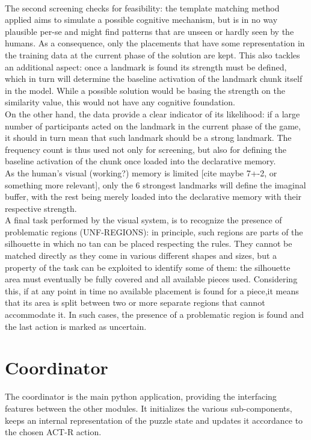 \documentclass[a4paper,singleside,12pt]{report} %
\begin{document}
    \\The second screening checks for feasibility: the template matching method applied aims to
    simulate a possible cognitive mechanism, but is in no way plausible per-se and might find
    patterns that are unseen or hardly seen by the humans. As a consequence, only the placements
    that have some representation in the training data at the current phase of the solution are
    kept. This also tackles an additional aspect: once a landmark is found its strength must be
    defined, which in turn will determine the baseline activation of the landmark chunk itself in
    the model. While a possible solution would be basing the strength on the similarity value, this
    would not have any cognitive foundation. \\On the other hand, the data provide a clear indicator
    of its likelihood: if a large number of participants acted on the landmark in the current phase
    of the game, it should in turn mean that such landmark should be a strong landmark. The
    frequency count is thus used not only for screening, but also for defining the baseline
    activation of the chunk once loaded into the declarative memory.\\
    As the human's visual (working?) memory is limited [cite maybe 7+-2, or something more
    relevant], only the 6 strongest landmarks will define the imaginal buffer, with the rest being
    merely loaded into the declarative memory with their respective strength.\\
    A final task performed by the visual system, is to recognize the presence of problematic regions
    (UNF-REGIONS): in principle, such regions are parts of the silhouette in which no tan can be
    placed respecting the rules. They cannot be matched directly as they come in various different
    shapes and sizes, but a property of the task can be exploited to identify some of them: the
    silhouette area must eventually be fully covered and all available pieces used. Considering
    this, if at any point in time no available placement is found for a piece,it means that its area
    is split between two or more separate regions that cannot accommodate it. In such cases, the
    presence of a problematic region is found and the last action is marked as uncertain.
    
    \section{Coordinator}
    The coordinator is the main python application, providing the interfacing features between the
    other modules. It initializes the various sub-components, keeps an internal representation of
    the puzzle state and updates it accordance to the chosen ACT-R action.
\end{document}
